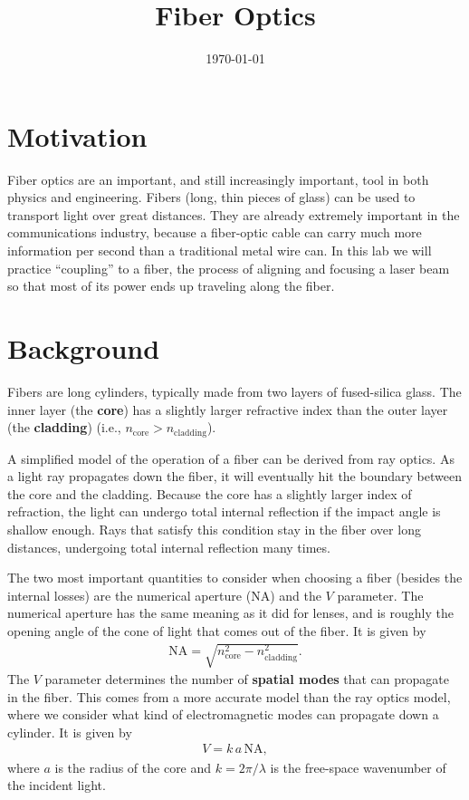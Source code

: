 \documentclass[]{manual}
\title{Fiber Optics}
\date{\today}
\begin{document}
    \maketitle
    \thispagestyle{firstpage}


    \section*{Motivation}

    Fiber optics are an important, and still increasingly important, tool in both physics and engineering.
    Fibers (long, thin pieces of glass) can be used to transport light over great distances.
    They are already extremely important in the communications industry, because a fiber-optic cable can carry much more information per second than a traditional metal wire can.
    In this lab we will practice ``coupling'' to a fiber, the process of aligning and focusing a laser beam so that most of its power ends up traveling along the fiber.

    \section*{Background}

    Fibers are long cylinders, typically made from two layers of fused-silica glass.
    The inner layer (the \textbf{core}) has a slightly larger refractive index than the outer layer (the \textbf{cladding}) (i.e., $n_{\mathrm{core}} > n_{\mathrm{cladding}}$).

    A simplified model of the operation of a fiber can be derived from ray optics.
    As a light ray propagates down the fiber, it will eventually hit the boundary between the core and the cladding.
    Because the core has a slightly larger index of refraction, the light can undergo total internal reflection if the impact angle is shallow enough.
    Rays that satisfy this condition stay in the fiber over long distances, undergoing total internal reflection many times.

    The two most important quantities to consider when choosing a fiber (besides the internal losses) are the numerical aperture (NA) and the $V$ parameter.
    The numerical aperture has the same meaning as it did for lenses, and is roughly the opening angle of the cone of light that comes out of the fiber.
    It is given by
    \begin{align}
        \mathrm{NA} = \sqrt{n_{\mathrm{core}}^2 - n_{\mathrm{cladding}}^2}.
    \end{align}
    The $V$ parameter determines the number of \textbf{spatial modes} that can propagate in the fiber.
    This comes from a more accurate model than the ray optics model, where we consider what kind of electromagnetic modes can propagate down a cylinder.
    It is given by
    \begin{align}
        V = k \, a \, \mathrm{NA},
    \end{align}
    where $a$ is the radius of the core and $k = 2\pi / \lambda$ is the free-space wavenumber of the incident light.
\end{document}
